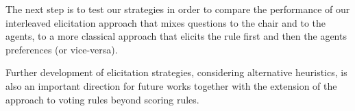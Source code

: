 \documentclass[a4paper,twoside]{article}
\begin{document}
The next step is to test our strategies in order to compare the performance of our interleaved elicitation approach that mixes questions to the chair and to the agents, to a more classical approach that elicits the rule first and then the agents preferences (or vice-versa). 

Further development of elicitation strategies, considering alternative heuristics, is also an important direction for future works together with the extension of the approach to voting rules beyond scoring rules.



% 
\end{document}
